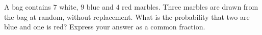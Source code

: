 A bag contains $7$ white, $9$ blue and $4$ red marbles. Three marbles are drawn from the bag at random, without replacement. What is the probability that two are blue and one is red? Express your answer as a common fraction.
